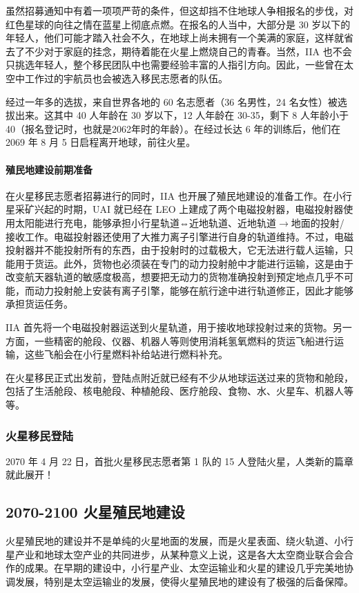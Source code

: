 \documentclass[letterpaper,10pt]{sphinxmanual}
\begin{document}
虽然招募通知中有着一项项严苛的条件，但这却挡不住地球人争相报名的步伐，对红色星球的向往之情在蓝星上彻底点燃。在报名的人当中，大部分是 30 岁以下的年轻人，他们可能才踏入社会不久，在地球上尚未拥有一个美满的家庭，这样就省去了不少对于家庭的挂念，期待着能在火星上燃烧自己的青春。当然，IIA 也不会只挑选年轻人，整个移民团队中也需要经验丰富的人指引方向。因此，一些曾在太空中工作过的宇航员也会被选入移民志愿者的队伍。

经过一年多的选拔，来自世界各地的 60 名志愿者（36 名男性，24 名女性）被选拔出来。这其中 40 人年龄在 30 岁以下，12 人年龄在 30-35，剩下 8 人年龄小于40（报名登记时，也就是2062年时的年龄）。在经过长达 6 年的训练后，他们在 2069 年 8 月 5 日启程离开地球，前往火星。


\paragraph{殖民地建设前期准备}
\label{history:id17}
在火星移民志愿者招募进行的同时，IIA 也开展了殖民地建设的准备工作。在小行星采矿兴起的时期，UAI 就已经在 LEO 上建成了两个电磁投射器，电磁投射器使用太阳能进行充电，能够承担小行星轨道⇔近地轨道、近地轨道\(\rightarrow\)地面的投射/接收工作。电磁投射器还使用了大推力离子引擎进行自身的轨道维持。不过，电磁投射器并不能投射所有的东西，由于投射时的过载极大，它无法进行载人运输，只能用于货运。此外，货物也必须装在专门的动力投射舱中才能进行运输，这是由于改变航天器轨道的敏感度极高，想要把无动力的货物准确投射到预定地点几乎不可能，而动力投射舱上安装有离子引擎，能够在航行途中进行轨道修正，因此才能够承担货运任务。

IIA 首先将一个电磁投射器运送到火星轨道，用于接收地球投射过来的货物。另一方面，一些精密的舱段、仪器、机器人等则使用消耗氢氧燃料的货运飞船进行运输，这些飞船会在小行星燃料补给站进行燃料补充。

在火星移民正式出发前，登陆点附近就已经有不少从地球运送过来的货物和舱段，包括了生活舱段、核电舱段、种植舱段、医疗舱段、食物、水、火星车、机器人等等。


\subsubsection{火星移民登陆}
\label{history:id18}
2070 年 4 月 22 日，首批火星移民志愿者第 1 队的 15 人登陆火星，人类新的篇章就此展开！
\begin{figure}[htbp]
\centering
\end{figure}


\subsection{2070-2100 火星殖民地建设}
\label{history:id19}
火星殖民地的建设并不是单纯的火星地面的发展，而是火星表面、绕火轨道、小行星产业和地球太空产业的共同进步，从某种意义上说，这是各大太空商业联合会合作的成果。在早期的建设中，小行星产业、太空运输业和火星的建设几乎完美地协调发展，特别是太空运输业的发展，使得火星殖民地的建设有了极强的后备保障。
\end{document}
